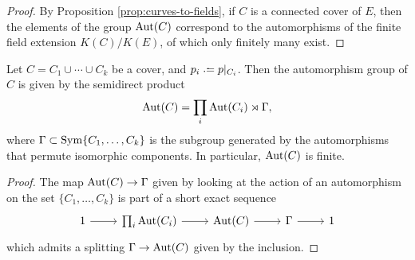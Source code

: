 \begin{proof}
 By Proposition \ref{prop:curves-to-fields}, if $C$ is a connected cover of $E$, then the elements of the group $\operatorname{Aut}(C)$ correspond to the automorphisms of the finite field extension $K(C)/K(E)$, of which only finitely many exist.
\end{proof}

\begin{prop}
 Let $C=C_1 \cup \dotsb \cup C_k$ be a cover, and $p_i\defeq p|_{C_i}$. Then the automorphism group of $C$ is given by the semidirect product \[\operatorname{Aut}(C) = \prod_i \operatorname{Aut}(C_i) \rtimes \Gamma,\] where $\Gamma \subset \operatorname{Sym}\{C_1, \dotsc, C_k\}$ is the subgroup generated by the automorphisms that permute isomorphic components. In particular, $\operatorname{Aut}(C)$ is finite.
\end{prop}
 
\begin{proof}
 The map $\operatorname{Aut}(C) \to \Gamma$ given by looking at the action of an automorphism on the set $\{C_1,\dotsc,C_k\}$ is part of a short exact sequence \[\ses{1}{\prod_i \Aut(C_i)}{\Aut(C)}{\Gamma}{}{}\]
 which admits a splitting $\Gamma \to \operatorname{Aut}(C)$ given by the inclusion.
\end{proof}

